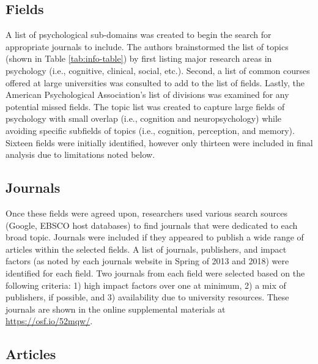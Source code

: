\documentclass[english,man]{apa6}
\theoremstyle{definition}
\theoremstyle{definition}
\theoremstyle{definition}
\theoremstyle{remark}
\begin{document}
\subsection{Fields}\label{fields}

A list of psychological sub-domains was created to begin the search for
appropriate journals to include. The authors brainstormed the list of
topics (shown in Table \ref{tab:info-table}) by first listing major
research areas in psychology (i.e., cognitive, clinical, social, etc.).
Second, a list of common courses offered at large universities was
consulted to add to the list of fields. Lastly, the American
Psychological Association's list of divisions was examined for any
potential missed fields. The topic list was created to capture large
fields of psychology with small overlap (i.e., cognition and
neuropsychology) while avoiding specific subfields of topics (i.e.,
cognition, perception, and memory). Sixteen fields were initially
identified, however only thirteen were included in final analysis due to
limitations noted below.

\subsection{Journals}\label{journals}

Once these fields were agreed upon, researchers used various search
sources (Google, EBSCO host databases) to find journals that were
dedicated to each broad topic. Journals were included if they appeared
to publish a wide range of articles within the selected fields. A list
of journals, publishers, and impact factors (as noted by each journals
website in Spring of 2013 and 2018) were identified for each field. Two
journals from each field were selected based on the following criteria:
1) high impact factors over one at minimum, 2) a mix of publishers, if
possible, and 3) availability due to university resources. These
journals are shown in the online supplemental materials at
\url{https://osf.io/52mqw/}.

\subsection{Articles}\label{articles}
\end{document}
